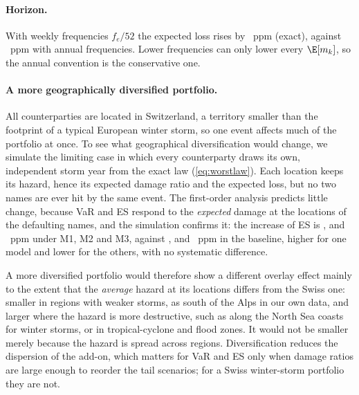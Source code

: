 \paragraph{Horizon.}
With weekly frequencies $f_e/52$ the expected loss rises by ~ppm (exact), against ~ppm with annual frequencies. Lower frequencies can only lower every $\E[m_k]$, so the annual convention is the conservative one.

\paragraph{A more geographically diversified portfolio.}
All counterparties are located in Switzerland, a territory smaller than the footprint of a typical European winter storm, so one event affects much of the portfolio at once. To see what geographical diversification would change, we simulate the limiting case in which every counterparty draws its own, independent storm year from the exact law (\ref{eq:worstlaw}). Each location keeps its hazard, hence its expected damage ratio and the expected loss, but no two names are ever hit by the same event. The first-order analysis predicts little change, because VaR and ES respond to the \emph{expected} damage at the locations of the defaulting names, and the simulation confirms it: the increase of ES is ,  and ~ppm under M1, M2 and M3, against ,  and ~ppm in the baseline, higher for one model and lower for the others, with no systematic difference.

A more diversified portfolio would therefore show a different overlay effect mainly to the extent that the \emph{average} hazard at its locations differs from the Swiss one: smaller in regions with weaker storms, as south of the Alps in our own data, and larger where the hazard is more destructive, such as along the North Sea coasts for winter storms, or in tropical-cyclone and flood zones. It would not be smaller merely because the hazard is spread across regions. Diversification reduces the dispersion of the add-on, which matters for VaR and ES only when damage ratios are large enough to reorder the tail scenarios; for a Swiss winter-storm portfolio they are not.

